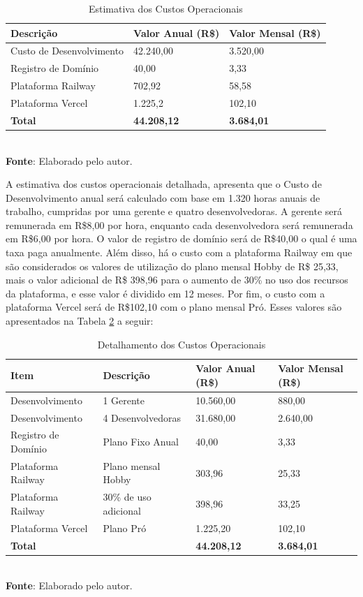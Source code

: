 \begin{table}[h!]
\centering
\caption{Estimativa dos Custos Operacionais}
\begin{tabular}{|m{5cm}|m{4cm}|m{4cm}|}
\hline
\textbf{Descrição}   & \textbf{Valor Anual (R\$)} & \textbf{Valor Mensal (R\$)} \\
\hline
Custo de Desenvolvimento & 42.240,00 & 3.520,00 \\
\hline
Registro de Domínio & 40,00 & 3,33 \\
\hline
Plataforma Railway & 702,92 & 58,58 \\
\hline
Plataforma Vercel & 1.225,2  & 102,10 \\
\hline
\textbf{Total} & \textbf{44.208,12} & \textbf{3.684,01} \\
\hline
\end{tabular}
\label{table:estimativa-custos}
\\[1ex]
\footnotesize \textbf{Fonte}: Elaborado pelo autor.
\end{table}

A estimativa dos custos operacionais detalhada, apresenta que o Custo de Desenvolvimento anual será calculado com base em 1.320 horas anuais de trabalho, cumpridas por uma gerente e quatro desenvolvedoras. A gerente será remunerada em R\$8,00 por hora, enquanto cada desenvolvedora será remunerada em R\$6,00 por hora. O valor de registro de domínio será de R\$40,00 o qual é uma taxa paga anualmente. Além disso, há o custo com a plataforma Railway em que são considerados os valores de utilização do plano mensal Hobby de R\$ 25,33, mais o valor adicional de R\$ 398,96 para o aumento de 30\% no uso dos recursos da plataforma, e esse valor é dividido em 12 meses. Por fim,  o custo com a plataforma Vercel será de R\$102,10 com o plano mensal Pró. Esses valores são apresentados  na Tabela \ref{table:detalhamento-custos} a seguir:

\begin{table}[h!]
\centering
\caption{Detalhamento dos Custos Operacionais}
\begin{tabular}{|m{4cm}|m{4cm}|m{3cm}|m{3cm}|}
\hline
\textbf{Item} & \textbf{Descrição} & \textbf{Valor Anual (R\$)} & \textbf{Valor Mensal (R\$)} \\
\hline
Desenvolvimento & 1 Gerente  & 10.560,00 & 880,00 \\
\hline
 Desenvolvimento & 4 Desenvolvedoras & 31.680,00 & 2.640,00 \\
\hline
Registro de Domínio & Plano Fixo Anual & 40,00 & 3,33 \\
\hline
Plataforma Railway & Plano mensal Hobby & 303,96 & 25,33 \\
\hline
Plataforma Railway & 30\% de uso adicional & 398,96 & 33,25 \\
\hline
Plataforma Vercel & Plano Pró & 1.225,20 & 102,10 \\
\hline
\textbf{Total} & & \textbf{44.208,12} & \textbf{3.684,01} \\
\hline
\end{tabular}
\label{table:detalhamento-custos}
\\[1ex]
\footnotesize \textbf{Fonte}: Elaborado pelo autor.
\end{table}

